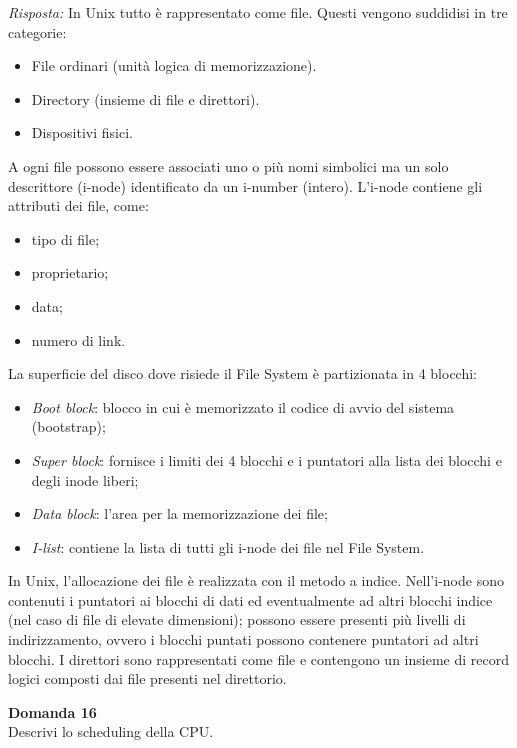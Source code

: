 \documentclass{article}
\newenvironment{problem}[2][Domanda]
    { \begin{mdframed}[backgroundcolor=gray!20] \textbf{#1 #2} \\}
    {  \end{mdframed}}
\newenvironment{solution}
    {\textit{Risposta:}}
    {}
\begin{document}
\begin{solution}
In Unix tutto è rappresentato come file.
\newline
Questi vengono suddidisi in tre categorie:
\begin{itemize}
    \item File ordinari (unità logica di memorizzazione).
    \item Directory (insieme di file e direttori).
    \item Dispositivi fisici.
\end{itemize}
A ogni file possono essere associati uno o più nomi simbolici ma un solo descrittore (i-node) identificato da un i-number (intero).
\newline
L’i-node contiene gli attributi dei file, come:
\begin{itemize}
    \item tipo di file;
    \item proprietario;
    \item data;
    \item numero di link.
\end{itemize}
La superficie del disco dove risiede il File System è partizionata in 4 blocchi:
\begin{itemize}
    \item \emph{Boot block}: blocco in cui è memorizzato il codice di avvio del sistema (bootstrap);
    \item \emph{Super block}: fornisce i limiti dei 4 blocchi e i puntatori alla lista dei blocchi e degli inode liberi;
    \item \emph{Data block}: l’area per la memorizzazione dei file;
    \item \emph{I-list}: contiene la lista di tutti gli i-node dei file nel File System.
\end{itemize}
In Unix, l’allocazione dei file è realizzata con il metodo a indice.
\newline
Nell’i-node sono contenuti i puntatori ai blocchi di dati ed eventualmente ad altri blocchi indice (nel caso di file di elevate dimensioni); possono essere presenti più livelli di indirizzamento, ovvero i blocchi puntati possono contenere puntatori ad altri blocchi.
\newline
I direttori sono rappresentati come file e contengono un insieme di record logici composti dai file presenti nel direttorio.
\end{solution}
\begin{problem}{16}
Descrivi lo scheduling della CPU.
\end{problem}
\end{document}
